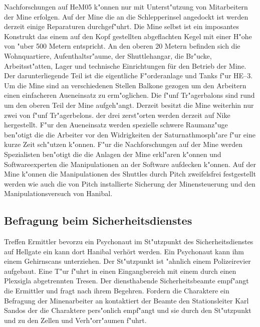 Nachforschungen auf HeM05 k"onnen nur mit Unterst"utzung von Mitarbeitern der Mine erfolgen. Auf der Mine die an die Schlepperinsel angedockt ist werden derzeit einige Reparaturen durchgef"uhrt. Die Mine selbst ist ein imposantes Konstrukt das einem auf den Kopf gestellten abgeflachten Kegel mit einer H"ohe von "uber 500 Metern entspricht. An den oberen 20 Metern befinden sich die Wohnquartiere, Aufenthaltsr"aume, der Shuttlehangar, die Br"ucke, Arbeitsst"atten, Lager und technische Einrichtungen für den Betrieb der Mine. Der darunterliegende Teil ist die eigentliche F"orderanlage und Tanks f"ur HE--3. Um die Mine sind an verschiedenen Stellen Balkone gezogen um den Arbeitern einen einfacheren Au\3eneinsatz zu erm"oglichen. Die f"unf Tr"agerbalons sind rund um den oberen Teil der Mine aufgeh"angt. 
Derzeit besitzt die Mine weiterhin nur zwei von f"unf Tr"agerbelons. der drei zerst"orten werden derzeit auf Nike hergestellt. F"ur den Au\3eneinsatz werden spezielle schwere Raumanz"uge ben"otigt die die Arbeiter vor den Widrigkeiten der Saturnathmosph"are f"ur eine kurze Zeit sch"utzen k"onnen. F"ur die Nachforschungen auf der Mine werden Spezialisten ben"otigt die die Anlagen der Mine erkl"aren k"onnen und Softwareexperten die Manipulationen an der Software aufdecken k"onnen. Auf der Mine k"onnen die Manipulationen des Shuttles durch Pitch zweifelsfrei festgestellt werden wie auch die von Pitch installierte Sicherung der Minensteuerung und den Manipulationsversuch von Hanibal.

\subsection{Befragung beim Sicherheitsdienstes}

Treffen Ermittler bevorzu ein Psychonaut im St"utzpunkt des Sicherheitsdienstes auf Hellgate ein kann dort Hanibal verhört werden. Ein Psychonaut kann ihm einem Gehirnscans unterziehen. Der St"utzpunkt ist "ahnlich einem Polizeirevier aufgebaut. Eine T"ur f"uhrt in einen Eingangbereich mit einem durch einen Plexsigla\3 abgetrennten Tresen. Der diensthabende Sicherheitsbeamte empf"angt die Ermittler und fragt nach ihrem Begehren. Fordern die Charaktere ein Befragung der Minenarbeiter an kontaktiert der Beamte den Stationsleiter Karl Sandos der die Charaktere pers"onlich empf"angt und sie durch den St"utzpunkt und zu den Zellen und Verh"orr"aumen f"uhrt.

